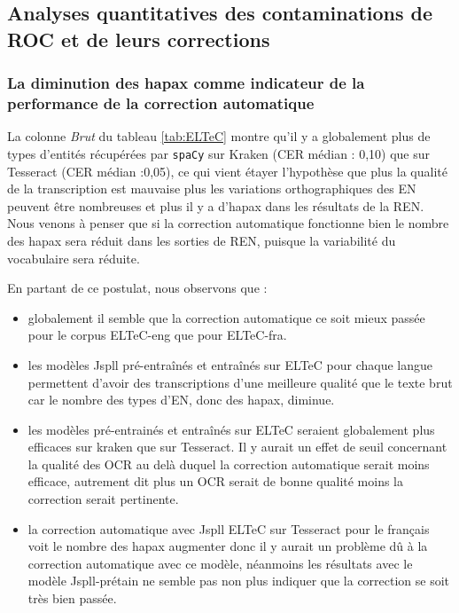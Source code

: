 %    


\subsection{Analyses quantitatives des contaminations de ROC et de leurs corrections}
\label{subsec:quantitative_COR-OCR-IMPACT-NER}
\subsubsection{La diminution des hapax comme indicateur de la performance de la correction automatique}
La colonne \textit{Brut} du tableau \ref{tab:ELTeC} montre qu'il y a globalement plus de types d'entités récupérées par \texttt{spaCy} sur Kraken (CER médian : 0,10) que sur Tesseract (CER médian :0,05), ce qui vient étayer l'hypothèse que plus la qualité de la transcription est mauvaise plus les variations orthographiques des EN peuvent être nombreuses et plus il y a d'hapax dans les résultats de la REN. Nous venons à penser que si la correction automatique fonctionne bien le nombre des hapax sera réduit dans les sorties de REN, puisque la variabilité du vocabulaire sera réduite.

En partant de ce postulat, nous observons que :
\begin{itemize}
\item globalement il semble que la correction automatique ce soit mieux passée pour le corpus ELTeC-eng que pour ELTeC-fra.
\item les modèles Jspll pré-entraînés et entraînés sur ELTeC pour chaque langue permettent d'avoir des transcriptions d'une meilleure qualité que le texte brut car le nombre des types d'EN, donc des hapax, diminue.
\item les modèles pré-entrainés  et entraînés sur ELTeC seraient globalement plus efficaces sur kraken que sur Tesseract. Il y aurait un effet de seuil concernant la qualité des OCR au delà duquel la correction automatique serait moins efficace, autrement dit plus un OCR serait de bonne qualité moins la correction serait pertinente. 
\item la correction automatique avec Jspll ELTeC sur Tesseract pour le français voit le nombre des hapax augmenter donc il y aurait un problème dû à la correction automatique avec ce modèle, néanmoins les résultats avec le modèle Jspll-prétain ne semble pas non plus indiquer que la correction se soit très bien passée.
\end{itemize}
 
